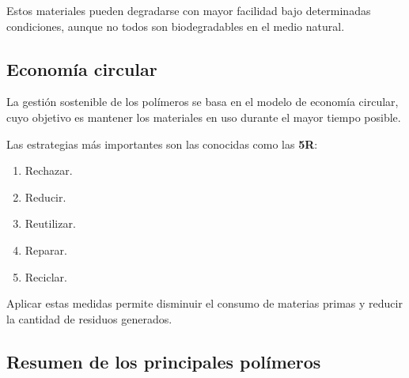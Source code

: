 Estos materiales pueden degradarse con mayor facilidad bajo determinadas condiciones,
aunque no todos son biodegradables en el medio natural.


\subsection{Economía circular}

La gestión sostenible de los polímeros se basa en el modelo de economía circular,
cuyo objetivo es mantener los materiales en uso durante el mayor tiempo posible.

Las estrategias más importantes son las conocidas como las \textbf{5R}:

\begin{enumerate}

\item Rechazar.

\item Reducir.

\item Reutilizar.

\item Reparar.

\item Reciclar.

\end{enumerate}

Aplicar estas medidas permite disminuir el consumo de materias primas y reducir la
cantidad de residuos generados.


\subsection{Resumen de los principales polímeros}

